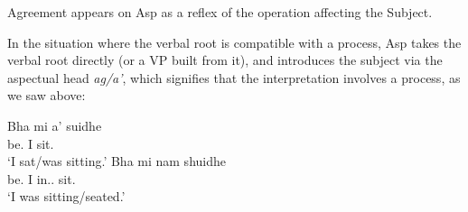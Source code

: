 \documentclass[output=paper]{langsci/langscibook}
\begin{document}
\ea \label{tree1}
\hspace*{-2em}
\z
Agreement appears on Asp as a reflex of the  operation affecting the
Subject.

In the situation where the verbal root is compatible with a process, Asp takes
the verbal root directly (or a VP built from it), and introduces the subject via the aspectual head
\emph{ag/a'}, which signifies that the interpretation involves a process, as we
saw above:

\ea {}
\ea\gll Bha mi a' suidhe\\
be.\Pst{} I \Simp{} sit.\Vn{}\\
\glt \enquote*{I sat/was sitting.}
\ex \gll Bha mi nam shuidhe\\
be.\Pst{} I in.\Poss.\Fsg{} sit.\Vn{}\\
\glt \enquote*{I was sitting/seated.}
\z \z
\end{document}
